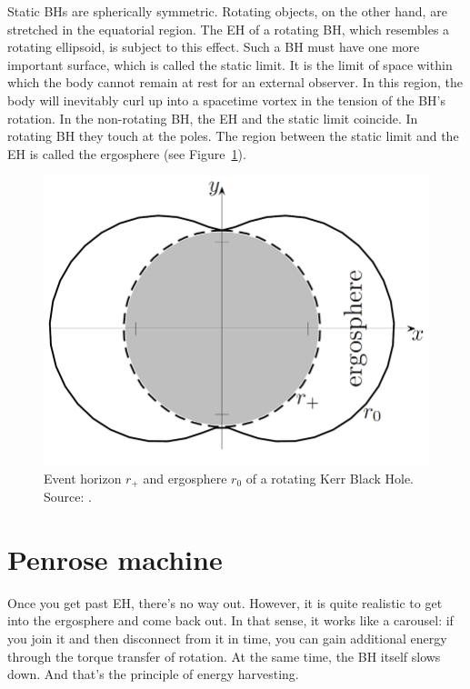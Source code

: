 \documentclass[fleqn,usenatbib]{mnras}
\begin{document}
Static BHs are spherically symmetric. Rotating objects, on the other hand, are stretched in the equatorial region. The EH of a rotating BH, which resembles a rotating ellipsoid, is subject to this effect. Such a BH must have one more important surface, which is called the static limit. It is the limit of space within which the body cannot remain at rest for an external observer. In this region, the body will inevitably curl up into a spacetime vortex in the tension of the BH's rotation. In the non-rotating BH, the EH and the static limit coincide. In rotating BH they touch at the poles. The region between the static limit and the EH is called the ergosphere (see Figure~\ref{fig:ergosphere}). 

\begin{figure} %
	\includegraphics[width=\columnwidth]{figures/ergosphere.png}
	\caption{Event horizon $r_+$ and ergosphere $r_0$ of a rotating Kerr Black Hole. Source: \citet{scharpf2017}.}
	\label{fig:ergosphere}
\end{figure}

\section{Penrose machine}

Once you get past EH, there's no way out. However, it is quite realistic to get into the ergosphere and come back out. In that sense, it works like a carousel: if you join it and then disconnect from it in time, you can gain additional energy through the torque transfer of rotation. At the same time, the BH itself slows down. And that's the principle of energy harvesting. 
\end{document}
